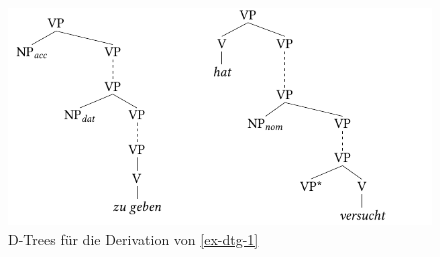 \begin{figure}[p]
\centering
\includegraphics{graphics/abb68.pdf}
\caption{\label{fig-dtg-1}D-Trees für die Derivation von \ref{ex-dtg-1}}
\end{figure}

